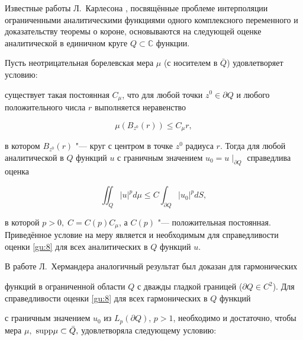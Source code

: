 


\smallskip




Известные работы Л.~Карлесона \cite{Car58,Car62}, посвящённые проблеме интерполяции ограниченными аналитическими функциями одного комплексного переменного и доказательству теоремы о короне, основываются на следующей оценке аналитической в единичном круге $Q \subset {\mathbb C}$ функции.



Пусть неотрицательная борелевская мера $\mu$ (с носителем в ${\bar {Q}}$) удовлетворяет условию:

существует такая постоянная $C_{\mu}$, что для любой точки $z^0 \in \partial Q$ и любого положительного числа $r$ выполняется неравенство

$$

\mu (B_{z^0}(r)) \leq C_{\mu} r,

$$

в котором $B_{z^0}(r)$ "--- круг с центром в точке $z^0$ радиуса $r$. Тогда для любой аналитической в $Q$ функций $u$ с граничным значением $u_0 = u\mid_{\partial Q}$ справедлива оценка

\begin{equation}

\iint_Q |u|^p d\mu \leq C \int_{\partial Q} |u_0|^p dS, 

\label{gu:8}

\end{equation}

в которой $ p > 0, \; C = C(p) C_{\mu}$, а $C(p)$ "--- положительная постоянная. Приведённое условие на меру является и необходимым для справедливости оценки \eqref{gu:8} для всех аналитических в $Q$ функций $u$.



В работе Л.~Хермандера \cite{Her} аналогичный результат был доказан для гармонических

функций в ограниченной области $Q$ с дважды гладкой границей ($\partial Q

\in C^2$). Для справедливости оценки \eqref{gu:8} для всех гармонических в $Q$ функций

с граничным значением $u_0$ из $L_p(\partial Q)$, $p > 1$, необходимо и достаточно, чтобы мера $\mu,$ ${\mathop{\rm supp}\nolimits} \mu \subset {\bar {Q}},$ удовлетворяла следующему условию:

